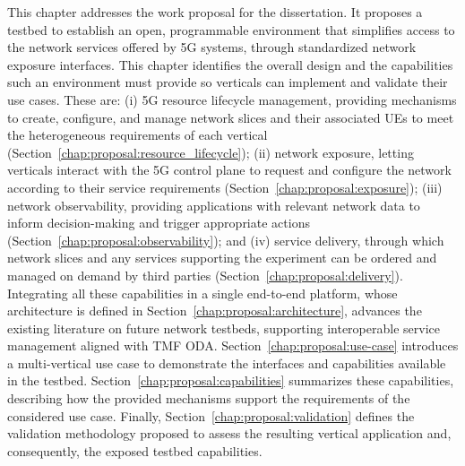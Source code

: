 This chapter addresses the work proposal for the dissertation. It proposes a testbed to establish an open, programmable environment that simplifies access to the network services offered by \acs{5G} systems, through standardized network exposure interfaces. This chapter identifies the overall design and the capabilities such an environment must provide so verticals can implement and validate their use cases. These are: (i) \acs{5G} resource lifecycle management, providing mechanisms to create, configure, and manage network slices and their associated \acsp{UE} to meet the heterogeneous requirements of each vertical (Section~\ref{chap:proposal:resource_lifecycle}); (ii) network exposure, letting verticals interact with the \acs{5G} control plane to request and configure the network according to their service requirements (Section~\ref{chap:proposal:exposure}); (iii) network observability, providing applications with relevant network data to inform decision-making and trigger appropriate actions (Section~\ref{chap:proposal:observability}); and (iv) service delivery, through which network slices and any services supporting the experiment can be ordered and managed on demand by third parties (Section~\ref{chap:proposal:delivery}). Integrating all these capabilities in a single end-to-end platform, whose architecture is defined in Section~\ref{chap:proposal:architecture}, advances the existing literature on future network testbeds, supporting interoperable service management aligned with \acs{TMF} \acs{ODA}. Section~\ref{chap:proposal:use-case} introduces a multi-vertical use case to demonstrate the interfaces and capabilities available in the testbed. Section~\ref{chap:proposal:capabilities} summarizes these capabilities, describing how the provided mechanisms support the requirements of the considered use case. Finally, Section~\ref{chap:proposal:validation} defines the validation methodology proposed to assess the resulting vertical application and, consequently, the exposed testbed capabilities.
